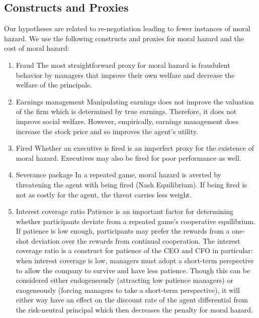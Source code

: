 \documentclass{article}
\begin{document}
\subsection{Constructs and Proxies}
Our hypotheses are related to re-negotiation leading to fewer instances of moral hazard. We use the following constructs and proxies for moral hazard and the cost of moral hazard:
\begin{enumerate}
	\item Fraud
	\subitem The most straightforward proxy for moral hazard is fraudulent behavior by managers that improve their own welfare and decrease the welfare of the principals.
	\item Earnings management
	\subitem Manipulating earnings does not improve the valuation of the firm which is determined by true earnings. Therefore, it does not improve social welfare. However, empirically, earnings management does increase the stock price and so improves the agent's utility.
	\item Fired
	\subitem Whether an executive is fired is an imperfect proxy for the existence of moral hazard. Executives may also be fired for poor performance as well.
	\item Severance package
	\subitem In a repeated game, moral hazard is averted by threatening the agent with being fired (Nash Equilibrium). If being fired is not as costly for the agent, the threat carries less weight. 
	\item Interest coverage ratio
	\subitem Patience is an important factor for determining whether participants deviate from a repeated game's cooperative equilibrium. If patience is low enough, participants may prefer the rewards from a one-shot deviation over the rewards from continual cooperation. The interest coverage ratio is a construct for patience of the CEO and CFO in particular: when interest coverage is low, managers must adopt a short-term perspective to allow the company to survive and have less patience. Though this can be considered either endogeneously (attracting low patience managers) or exogeneously (forcing managers to take a short-term perspective), it will either way have an effect on the discount rate of the agent differential from the risk-neutral principal which then decreases the penalty for moral hazard.
\end{enumerate}
\end{document}
